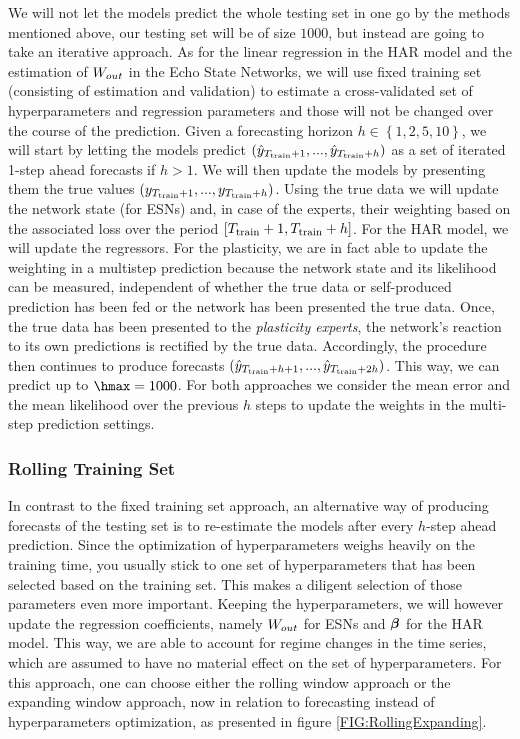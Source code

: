 We will not let the models predict the whole testing set in one go by the methods mentioned above, our testing set will be of size $1000$, but instead are going to take an iterative approach. As for the linear regression in the HAR model and the estimation of $W_{out}$ in the Echo State Networks, we will use fixed training set (consisting of estimation and validation) to estimate a cross-validated set of hyperparameters and regression parameters and those will not be changed over the course of the prediction. Given a forecasting horizon $h \in \left\{1,2,5,10\right\}$, we will start by letting the models predict $(\hat y_{T_{\text{train}} +1}, ..., \hat y_{T_{\text{train}} + h})$ as a set of iterated 1-step ahead forecasts if $h > 1$. We will then update the models by presenting them the true values $(y_{T_{\text{train}} +1}, ..., y_{T_{\text{train}} + h})$. Using the true data we will update the network state (for ESNs) and, in case of the experts, their weighting based on the associated loss over the period $[T_{\text{train}} +1, T_{\text{train}} + h]$. For the HAR model, we will update the regressors. For the plasticity, we are in fact able to update the weighting in a multistep prediction because the network state and its likelihood can be measured, independent of whether the true data or self-produced prediction has been fed or the network has been presented the true data. Once, the true data has been presented to the \textit{plasticity experts}, the network's reaction to its own predictions is rectified by the true data. Accordingly, the procedure then continues to produce forecasts $(\hat y_{T_{\text{train}} + h +1}, ..., \hat y_{T_{\text{train}} + 2h})$. This way, we can predict up to $\hmax = 1000$.
For both approaches we consider the mean error and the mean likelihood over the previous $h$ steps to update the weights in the multi-step prediction settings.

\subsubsection{Rolling Training Set}
\label{CH:Application:Forecasting:Rolling}

In contrast to the fixed training set approach, an alternative way of producing forecasts of the testing set is to re-estimate the models after every $h$-step ahead prediction. Since the optimization of hyperparameters weighs heavily on the training time, you usually stick to one set of hyperparameters that has been selected based on the training set. This makes a diligent selection of those parameters even more important. Keeping the hyperparameters, we will  however update the regression coefficients, namely $W_{out}$ for ESNs and ${{\bm \beta}}$ for the HAR model. This way, we are able to account for regime changes in the time series, which are assumed to have no material effect on the set of hyperparameters.
For this approach, one can choose either the rolling window approach or the expanding window approach, now in relation to forecasting instead of hyperparameters optimization, as presented in figure \ref{FIG:RollingExpanding}.